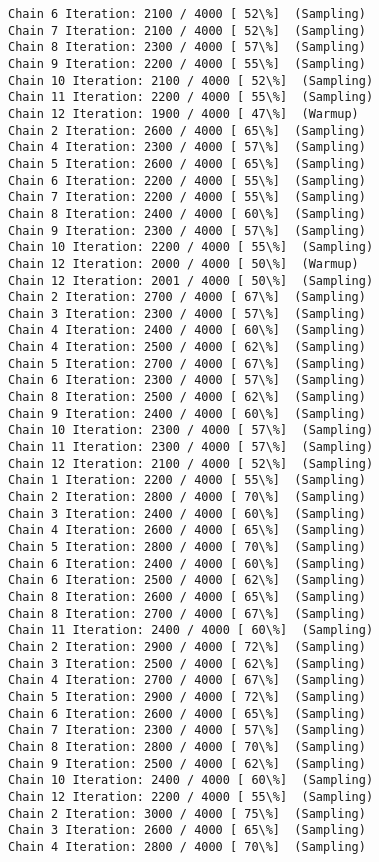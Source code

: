 \documentclass[11pt]{article}
\begin{document}
\begin{Verbatim}[commandchars=\\\{\}]
Chain 6 Iteration: 2100 / 4000 [ 52\%]  (Sampling)
Chain 7 Iteration: 2100 / 4000 [ 52\%]  (Sampling)
Chain 8 Iteration: 2300 / 4000 [ 57\%]  (Sampling)
Chain 9 Iteration: 2200 / 4000 [ 55\%]  (Sampling)
Chain 10 Iteration: 2100 / 4000 [ 52\%]  (Sampling)
Chain 11 Iteration: 2200 / 4000 [ 55\%]  (Sampling)
Chain 12 Iteration: 1900 / 4000 [ 47\%]  (Warmup)
Chain 2 Iteration: 2600 / 4000 [ 65\%]  (Sampling)
Chain 4 Iteration: 2300 / 4000 [ 57\%]  (Sampling)
Chain 5 Iteration: 2600 / 4000 [ 65\%]  (Sampling)
Chain 6 Iteration: 2200 / 4000 [ 55\%]  (Sampling)
Chain 7 Iteration: 2200 / 4000 [ 55\%]  (Sampling)
Chain 8 Iteration: 2400 / 4000 [ 60\%]  (Sampling)
Chain 9 Iteration: 2300 / 4000 [ 57\%]  (Sampling)
Chain 10 Iteration: 2200 / 4000 [ 55\%]  (Sampling)
Chain 12 Iteration: 2000 / 4000 [ 50\%]  (Warmup)
Chain 12 Iteration: 2001 / 4000 [ 50\%]  (Sampling)
Chain 2 Iteration: 2700 / 4000 [ 67\%]  (Sampling)
Chain 3 Iteration: 2300 / 4000 [ 57\%]  (Sampling)
Chain 4 Iteration: 2400 / 4000 [ 60\%]  (Sampling)
Chain 4 Iteration: 2500 / 4000 [ 62\%]  (Sampling)
Chain 5 Iteration: 2700 / 4000 [ 67\%]  (Sampling)
Chain 6 Iteration: 2300 / 4000 [ 57\%]  (Sampling)
Chain 8 Iteration: 2500 / 4000 [ 62\%]  (Sampling)
Chain 9 Iteration: 2400 / 4000 [ 60\%]  (Sampling)
Chain 10 Iteration: 2300 / 4000 [ 57\%]  (Sampling)
Chain 11 Iteration: 2300 / 4000 [ 57\%]  (Sampling)
Chain 12 Iteration: 2100 / 4000 [ 52\%]  (Sampling)
Chain 1 Iteration: 2200 / 4000 [ 55\%]  (Sampling)
Chain 2 Iteration: 2800 / 4000 [ 70\%]  (Sampling)
Chain 3 Iteration: 2400 / 4000 [ 60\%]  (Sampling)
Chain 4 Iteration: 2600 / 4000 [ 65\%]  (Sampling)
Chain 5 Iteration: 2800 / 4000 [ 70\%]  (Sampling)
Chain 6 Iteration: 2400 / 4000 [ 60\%]  (Sampling)
Chain 6 Iteration: 2500 / 4000 [ 62\%]  (Sampling)
Chain 8 Iteration: 2600 / 4000 [ 65\%]  (Sampling)
Chain 8 Iteration: 2700 / 4000 [ 67\%]  (Sampling)
Chain 11 Iteration: 2400 / 4000 [ 60\%]  (Sampling)
Chain 2 Iteration: 2900 / 4000 [ 72\%]  (Sampling)
Chain 3 Iteration: 2500 / 4000 [ 62\%]  (Sampling)
Chain 4 Iteration: 2700 / 4000 [ 67\%]  (Sampling)
Chain 5 Iteration: 2900 / 4000 [ 72\%]  (Sampling)
Chain 6 Iteration: 2600 / 4000 [ 65\%]  (Sampling)
Chain 7 Iteration: 2300 / 4000 [ 57\%]  (Sampling)
Chain 8 Iteration: 2800 / 4000 [ 70\%]  (Sampling)
Chain 9 Iteration: 2500 / 4000 [ 62\%]  (Sampling)
Chain 10 Iteration: 2400 / 4000 [ 60\%]  (Sampling)
Chain 12 Iteration: 2200 / 4000 [ 55\%]  (Sampling)
Chain 2 Iteration: 3000 / 4000 [ 75\%]  (Sampling)
Chain 3 Iteration: 2600 / 4000 [ 65\%]  (Sampling)
Chain 4 Iteration: 2800 / 4000 [ 70\%]  (Sampling)

\end{Verbatim}
\end{document}
